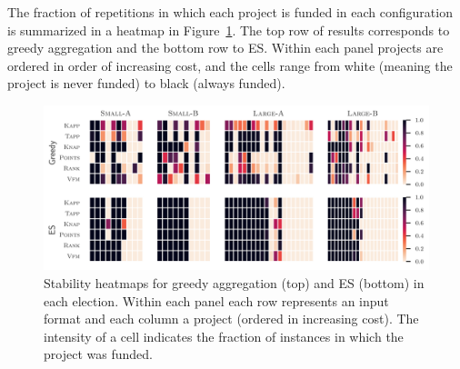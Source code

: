 \documentclass[letterpaper]{article} %
\newcommand{\mes}{ES}
\begin{document}
The fraction of repetitions in which each project is funded in each configuration is summarized in a heatmap in Figure~\ref{fig:heatmap}. The top row of results corresponds to greedy aggregation and the bottom row to \mes. Within each panel projects are ordered in order of increasing cost, and the cells range from white (meaning the project is never funded) to black (always funded). 







\begin{figure}[h]
\begin{center}
\includegraphics[width=17.5cm]{experiment/heatmaps.png}
\caption{Stability heatmaps for  greedy aggregation (top) and \mes{} (bottom) in each election. 
Within each panel each row represents an   input format and each column a project (ordered in increasing cost).
 The intensity of a cell indicates the fraction of instances in which the project was funded.
}\label{fig:heatmap}
\end{center}\vspace{-3mm}
\end{figure}
\end{document}
